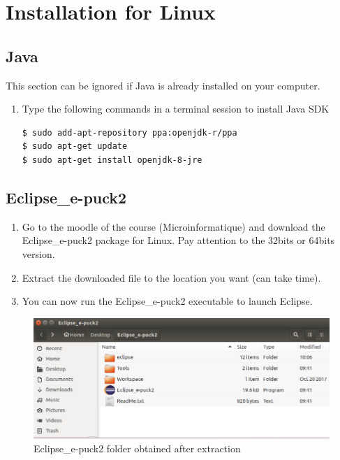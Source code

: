 \documentclass[a4paper]{article}
\begin{document}
\newpage
\section{Installation for Linux}

\subsection{Java}
This section can be ignored if Java is already installed on your computer.

\begin{enumerate}
\item Type the following commands in a terminal session to install Java SDK
\begin{lstlisting}
$ sudo add-apt-repository ppa:openjdk-r/ppa
$ sudo apt-get update
$ sudo apt-get install openjdk-8-jre
\end{lstlisting}
\end{enumerate}


\subsection{Eclipse\_e-puck2}

\begin{enumerate}
\item Go to the moodle of the course (Microinformatique) and download the Eclipse\_e-puck2 package for Linux.
Pay attention to the 32bits or 64bits version.
\item Extract the downloaded file to the location you want (can take time). 
\item You can now run the Eclipse\_e-puck2 executable to launch Eclipse.
\end{enumerate}

\begin{figure}[!h]
\centering
\includegraphics[width=1\columnwidth]{fig/Eclipse_e-puck2_Folder_Linux}
\caption{Eclipse\_e-puck2 folder obtained after extraction}
\label{fig:Eclipse_e-puck2_Folder_Linux}
\end{figure}
\end{document}

